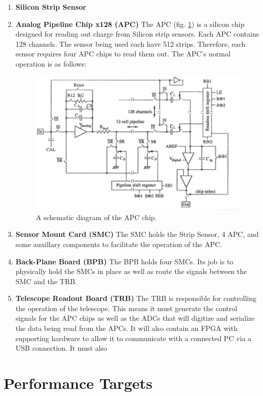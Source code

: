 \documentclass{article}
\newcommand{\itemt}[1]{\item \textbf{#1}}
\begin{document}
\begin{enumerate}
  \itemt{Silicon Strip Sensor}
  \itemt{Analog Pipeline Chip x128 (\gls{APC})}
    The \gls{APC} (fig. \ref{fig:APC128_Schematic}) is a silicon chip designed for reading out charge from Silicon strip sensors. Each \gls{APC} contains 128 channels. The sensor being used each have 512 strips. Therefore, each sensor requires four \gls{APC} chips to read them out. The \gls{APC}'s normal operation is as follows:

    \begin{figure}[h]
      \centering
      \includegraphics{./figures/APC128_Schematic.png}
      \caption{A schematic diagram of the \gls{APC} chip.}
      \label{fig:APC128_Schematic}
    \end{figure}

  \itemt{Sensor Mount Card (SMC)}
    The SMC holds the Strip Sensor, 4 \gls{APC}, and some auxillary components to facilitate the operation of the \gls{APC}.
  \itemt{Back-Plane Board (BPB)}
    The BPB holds four SMCs. Its job is to physically hold the SMCs in place as well as route the signals between the SMC and the TRB.
  \itemt{Telescope Readout Board (TRB)}
    The TRB is responsible for controlling the operation of the telescope. This means it must generate the control signals for the \gls{APC} chips as well as the ADCs that will digitize and serialize the data being read from the \gls{APC}s. It will also contain an FPGA with supporting hardware to allow it to communicate with a connected PC via a USB connection. It must also
\end{enumerate}

\section{Performance Targets}
\end{document}

